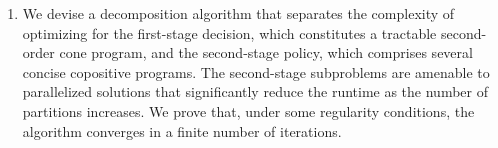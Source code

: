 \documentclass{article}
\begin{document}
\begin{enumerate}
    \item 	We devise a decomposition algorithm that separates the complexity of optimizing for the first-stage decision, which constitutes a tractable second-order cone program, and the second-stage policy, which comprises several concise copositive programs. The second-stage subproblems are amenable to parallelized solutions that significantly reduce the runtime as the number of partitions increases. We prove that, under some regularity conditions, the algorithm converges in a finite number of iterations. 
    
\end{enumerate}



\end{document}
